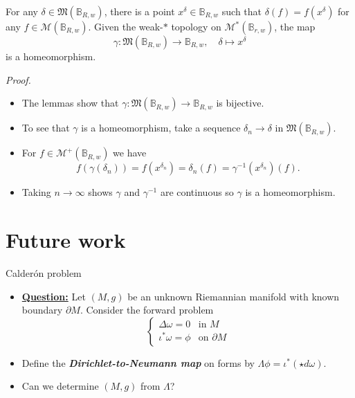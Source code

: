 \documentclass[aspectratio=169]{beamer}
\newcommand\boldgreen[1]{\textcolor{lighter_csu_green}{\emph{\textbf{#1}}}}
\newcommand{\characters}{\mathfrak{M}}
\newcommand{\monogenics}{\mathcal{M}}
\newcommand{\dualmonogenics}{\mathcal{M}^*}
\newcommand{\ball}{\mathbb{B}}
\begin{document}
\begin{frame}{}
\vfill
\begin{theorem}
For any $\delta \in \characters(\ball_{R,w})$, there is a point $x^\delta \in \ball_{R,w}$ such that $\delta(f)=f(x^\delta)$ for any $f\in \monogenics(\ball_{R,w})$. Given the weak-$\ast$ topology on $\dualmonogenics(\ball_{r,w})$, the map
\[
\gamma \colon \characters(\ball_{R,w}) \to \ball_{R,w}, \quad \delta \mapsto x^\delta
\]
is a homeomorphism.
\end{theorem}
\vfill
\end{frame}

\begin{frame}{}
\vfill
\emph{Proof.}
\begin{itemize}
\pause
\item The lemmas show that $\gamma \colon \characters(\ball_{R,w}) \to \ball_{R,w}$ is bijective. 
\pause
\item To see that $\gamma$ is a homeomorphism, take a sequence $\delta_n \to \delta$ in $\characters(\ball_{R,w})$.
\pause
\item For $f\in \monogenics^+(\ball_{R,w})$ we have
\[
f(\gamma(\delta_n))=f(x^{\delta_n})=\delta_n(f)=\gamma^{-1}(x^{\delta_n})(f).
\]
\vspace*{-0.1cm}
\pause
\item Taking $n\to \infty$ shows $\gamma$ and $\gamma^{-1}$ are continuous so $\gamma$ is a homeomorphism.
\end{itemize}
\vfill
\end{frame}

\section{Future work}

\begin{frame}{Calder\'on problem}
\vfill
\begin{itemize}
\pause
\item \textbf{\underline{Question:}} Let $(M,g)$ be an unknown Riemannian manifold with known boundary $\partial M$. Consider the forward problem
\[
\begin{cases}
\Delta \omega = 0 & \textrm{in $M$}\\
\iota^*\omega = \phi & \textrm{on $\partial M$}
\end{cases}
\]
\pause
\item Define the \boldgreen{Dirichlet-to-Neumann map} on forms by $\Lambda\phi = \iota^*(\star d \omega)$. 
\pause
\item Can we determine $(M,g)$ from $\Lambda$?
\end{itemize}
\vfill
\end{frame}
\end{document}
